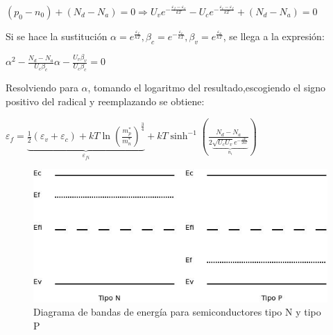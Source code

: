 \documentclass[oneside]{book}
\numberwithin{equation}{section}
\numberwithin{figure}{section}
\numberwithin{table}{section}
\begin{document}
			\begin{center}
				$\displaystyle (p_0-n_0)+(N_d-N_a)=0 \Rightarrow U_v e^{-\frac{\varepsilon_f-\varepsilon_v}{kT}}-U_c e^{-\frac{\varepsilon_c-\varepsilon_f}{kT}}+(N_d-N_a)=0$
			\end{center}	
			
			Si se hace la sustitución $\displaystyle \alpha=e^{\frac{\varepsilon_f}{kT}},\beta_c=e^{-\frac{\varepsilon_c}{kT}},\beta_v=e^{\frac{\varepsilon_v}{kT}}$, se llega a la expresión:\\
			
			\begin{center}
				$\displaystyle \alpha^2-\frac{N_d-N_a}{U_c \beta_c}\alpha-\frac{U_v \beta_v}{U_c \beta_c}=0$
			\end{center}
			
			Resolviendo para $\alpha$, tomando el logaritmo del resultado,escogiendo el signo positivo del radical y reemplazando se obtiene:\\
			
			\begin{center}
				$\displaystyle \varepsilon_f=\underbrace{\frac{1}{2}(\varepsilon_v+\varepsilon_c)+kT\ln\left(\frac{m_p^*}{m_n^*}\right)^{\frac{3}{4}}}_{\varepsilon_{fi}}+kT \sinh^{-1}\left(\frac{N_d-N_a}{2\underbrace{\sqrt{U_c U_v}e^{-\frac{\Delta \varepsilon}{2kT}}}_{n_i}}\right)$
			\end{center}
			\begin{center}
			\end{center}
			
			\begin{figure}[H]
				\begin{center}
					\includegraphics[scale=0.75]{Fermi-dopado.jpeg} 
					\caption{Diagrama de bandas de energía para semiconductores tipo N y tipo P}
				\end{center}
			\end{figure}
			
\end{document}
